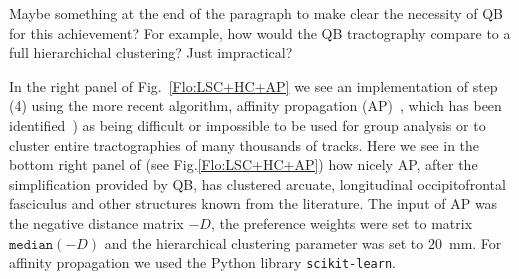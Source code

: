 \documentclass[preprint,authoryear,a4paper,10pt,onecolumn]{elsarticle}
\begin{document}
\begin{matthewsays}
  Maybe something at the end of the paragraph to make clear the necessity of QB
  for this achievement?  For example, how would the QB tractography compare to
  a full hierarchichal clustering?  Just impractical?
\end{matthewsays}

In the right panel of Fig.~\ref{Flo:LSC+HC+AP} we see an implementation
of step (4) using the more recent algorithm, affinity propagation
(AP)~\citep{dueck2009affinity}, which has been
identified~\citep{malcolm2009filtered}) as being difficult or impossible
to be used for group analysis or to cluster entire tractographies of
many thousands of tracks.
Here we see in the bottom right panel of (see Fig.\ref{Flo:LSC+HC+AP})
how nicely AP, after the simplification provided by QB, has clustered
arcuate, longitudinal occipitofrontal fasciculus and other structures
known from the literature. The input of AP was the negative distance
matrix $-D$, the preference weights were set to matrix $\mathtt{median}(-D)$
and the hierarchical clustering parameter was set to $20$~mm.
For affinity propagation we used the Python library \texttt{scikit-learn}.
\end{document}

